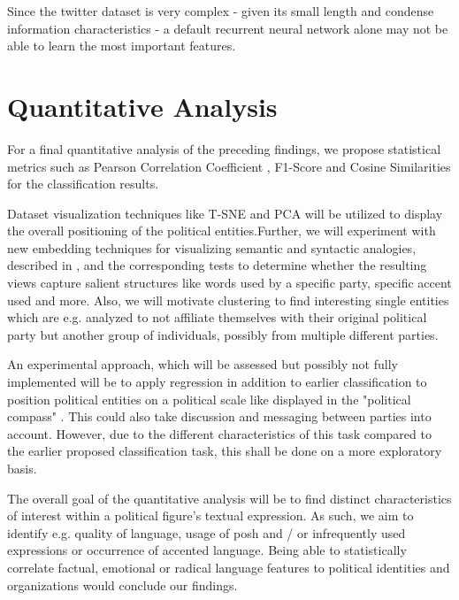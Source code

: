 \documentclass[10pt, oneside]{article}
\begin{document}
\begin{multicols}{2}
Since the twitter dataset is very complex - given its small length and condense information characteristics - a default recurrent neural network alone may not be able to learn the most important features.


\section{Quantitative Analysis}

For a final quantitative analysis of the preceding findings, we propose statistical metrics such as Pearson Correlation Coefficient \cite{Hauke2011}, F1-Score and Cosine Similarities for the classification results.

Dataset visualization techniques like T-SNE \cite{Laurens2008} and PCA \cite{Richardson2009} will be utilized to display the overall positioning of the political entities.Further, we will experiment with new embedding techniques for visualizing semantic and syntactic analogies, described in \cite{8019864}, and the corresponding tests to determine whether the resulting views capture salient structures like words used by a specific party, specific accent used and more. Also, we will motivate clustering to find interesting single entities which are e.g. analyzed to not affiliate themselves with their original political party but another group of individuals, possibly from multiple different parties.

An experimental approach, which will be assessed but possibly not fully implemented will be to apply regression in addition to earlier classification to position political entities on a political scale like displayed in the "political compass" \cite{PoliticalCompass2017}. This could also take discussion and messaging between parties into account.
However, due to the different characteristics of this task compared to the earlier proposed classification task, this shall be done on a more exploratory basis. 

The overall goal of the quantitative analysis will be to find distinct characteristics of interest within a political figure's textual expression. As such, we aim to identify e.g. quality of language, usage of posh and / or infrequently used expressions or occurrence of accented language.
Being able to statistically correlate factual, emotional or radical language features to political identities and organizations would conclude our findings.


\end{multicols}
\newpage
\end{document}
